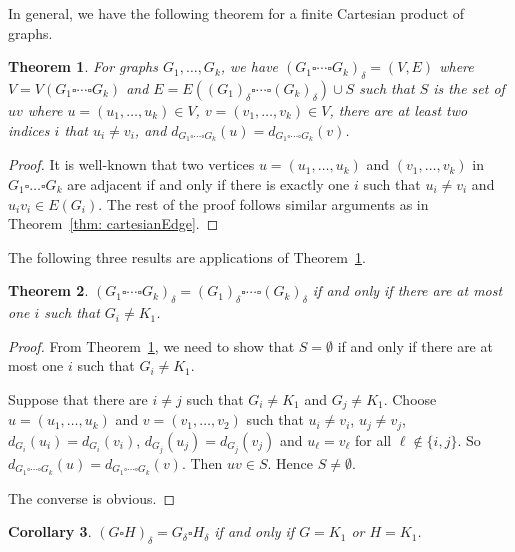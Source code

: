 \documentclass[12pt]{amsart}
\newtheorem{theorem}{Theorem}
\newtheorem{corollary}[theorem]{Corollary}
\newtheorem{example}[theorem]{Example}
\begin{document}

In general, we have the following theorem for a finite Cartesian product of graphs.
\begin{theorem}\label{thm: cartesianEdge_super}
    For graphs $G_1,\dots,G_k$, we have $(G_1\square\cdots\square G_k)_\delta=(V,E)$ where $V=V(G_1\square\cdots\square G_k)$ and $E=E((G_1)_{\delta}\square\cdots\square (G_k)_{\delta})\cup S$ 
    such that $S$ is the set of $uv$ where $u=(u_1,\dots,u_k)\in V$, $v=(v_1,\dots,v_k)\in V$, there are at least two indices $i$ that $u_i\neq v_i$, and $d_{G_1\square\cdots\square G_k}(u)=d_{G_1\square\cdots\square G_k}(v)$.
\end{theorem}
\begin{proof}
    It is well-known that two vertices $u=(u_1,\dots,u_k)$ and $(v_1,\dots,v_k)$ in $G_1\square\dots\square G_k$ are adjacent if and only if there is exactly one $i$ such that $u_i \neq v_i$ and $u_iv_i \in E(G_i)$.
    The rest of the proof follows similar arguments as in Theorem~\ref{thm: cartesianEdge}.
\end{proof}

The following three results are applications of Theorem~\ref{thm: cartesianEdge_super}.
\begin{theorem}
     $(G_1\square\cdots\square G_k)_\delta=(G_1)_{\delta}\square\cdots\square (G_k)_{\delta}$ if and only if there are at most one $i$ such that $G_i \neq K_1$. 
\end{theorem}
\begin{proof}
    From Theorem~\ref{thm: cartesianEdge_super}, we need to show that $S=\emptyset$ if and only if there are at most one $i$ such that $G_i \neq K_1$.
    
    Suppose that there are $i\neq j$ such that $G_i\neq K_1$ and $G_j\neq K_1$. 
    Choose $u=(u_1,\dots,u_k)$ and $v=(v_1,\dots,v_2)$ such that 
    $u_i\neq v_i$, $u_j \neq v_j$, $d_{G_i}(u_i)=d_{G_i}(v_i)$,  $d_{G_j}(u_j)=d_{G_j}(v_j)$ and $u_\ell = v_\ell$ for all $\ell \not\in \{i,j\}$.
    So $d_{G_1\square\cdots\square G_k}(u)=d_{G_1\square\cdots\square G_k}(v)$.
    Then $uv \in S$. Hence $S\neq \emptyset$.

    The converse is obvious.
\end{proof}

\begin{corollary}
     $(G\square H)_\delta=G_{\delta}\square H_{\delta}$ if and only if  $G=K_1$ or $H=K_1$.
\end{corollary}
\end{document}
